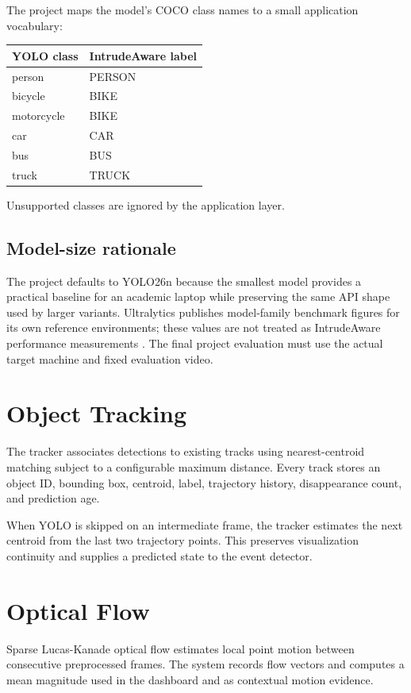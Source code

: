 \documentclass[12pt,a4paper]{report}
\begin{document}
The project maps the model's COCO class names to a small application vocabulary:
\begin{center}
\begin{tabular}{ll}
\toprule
YOLO class & IntrudeAware label\\
\midrule
person & PERSON\\
bicycle & BIKE\\
motorcycle & BIKE\\
car & CAR\\
bus & BUS\\
truck & TRUCK\\
\bottomrule
\end{tabular}
\end{center}
Unsupported classes are ignored by the application layer.

\subsection{Model-size rationale}
The project defaults to YOLO26n because the smallest model provides a practical baseline for an academic laptop while preserving the same API shape used by larger variants. Ultralytics publishes model-family benchmark figures for its own reference environments; these values are not treated as IntrudeAware performance measurements \cite{ultralytics_yolo26}. The final project evaluation must use the actual target machine and fixed evaluation video.

\section{Object Tracking}
The tracker associates detections to existing tracks using nearest-centroid matching subject to a configurable maximum distance. Every track stores an object ID, bounding box, centroid, label, trajectory history, disappearance count, and prediction age.

When YOLO is skipped on an intermediate frame, the tracker estimates the next centroid from the last two trajectory points. This preserves visualization continuity and supplies a predicted state to the event detector.

\section{Optical Flow}
Sparse Lucas-Kanade optical flow estimates local point motion between consecutive preprocessed frames. The system records flow vectors and computes a mean magnitude used in the dashboard and as contextual motion evidence.
\end{document}
